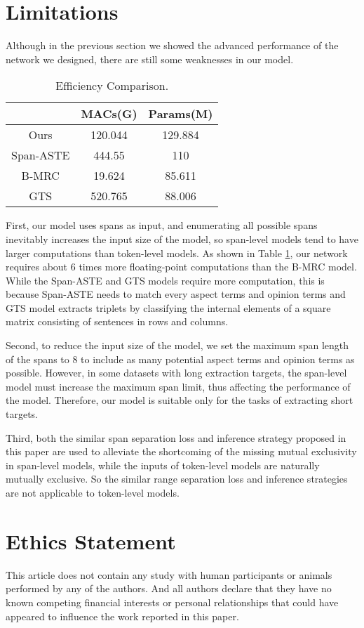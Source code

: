 \documentclass[11pt]{article}
\begin{document}
\section*{Limitations}
Although in the previous section we showed the advanced performance of the network we designed, there are still some weaknesses in our model.

\begin{table}[htpb]
	\footnotesize
	\centering
	\begin{tabular}{c|cc}
		\hline
		& MACs(G) & Params(M)  \\ \hline
		Ours      & 120.044 & 129.884   \\
		Span-ASTE & 444.55  & 110       \\
		B-MRC     & 19.624  & 85.611    \\
		GTS       & 520.765 & 88.006    \\ \hline
	\end{tabular}
\caption{Efficiency Comparison.}
\label{Efficiency}
\end{table}

First, our model uses spans as input, and enumerating all possible spans inevitably increases the input size of the model, so span-level models tend to have larger computations than token-level models. As shown in Table \ref{Efficiency}, our network requires about 6 times more floating-point computations than the B-MRC model. While the Span-ASTE and GTS models require more computation, this is because Span-ASTE needs to match every aspect terms and opinion terms and GTS model extracts triplets by classifying the internal elements of a square matrix consisting of sentences in rows and columns.

Second, to reduce the input size of the model, we set the maximum span length of the spans to 8 to include as many potential aspect terms and opinion terms as possible. However, in some datasets with long extraction targets, the span-level model must increase the maximum span limit, thus affecting the performance of the model. Therefore, our model is suitable only for the tasks of extracting short targets.

Third, both the similar span separation loss and inference strategy proposed in this paper are used to alleviate the shortcoming  of the missing mutual exclusivity in span-level models, while the inputs of token-level models are naturally mutually exclusive. So the similar range separation loss and inference strategies are not applicable to token-level models.

\section*{Ethics Statement}
	This article does not contain any study with human participants or animals performed by any of the authors. And all authors declare that they have no known competing financial interests or personal relationships that could have appeared to influence the work reported in this paper.




\appendix
\end{document}
